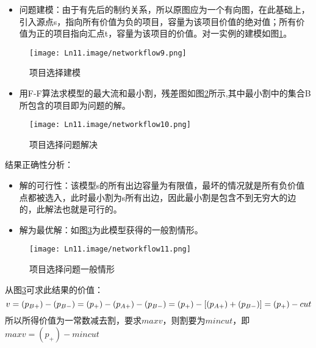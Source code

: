 \begin{itemize}
  \item 问题建模：由于有先后的制约关系，所以原图应为一个有向图，在此基础上，引入源点s，指向所有价值为负的项目，容量为该项目价值的绝对值；所有价值为正的项目指向汇点t，容量为该项目的价值。对一实例的建模如图\ref{fig9}。
\end{itemize}

\begin{figure}[htb]
  \centering
  \texttt{[image: Ln11.image/networkflow9.png]}
  \caption{项目选择建模}\label{fig9}
\end{figure}

\begin{itemize}
  \item 用F-F算法求模型的最大流和最小割，残差图如图\ref{fig10}所示,其中最小割中的集合B所包含的项目即为问题的解。
\end{itemize}

\begin{figure}[htb]
  \centering
  \texttt{[image: Ln11.image/networkflow10.png]}
  \caption{项目选择问题解决}\label{fig10}
\end{figure}

结果正确性分析：
\begin{itemize}
\item 解的可行性：该模型s的所有出边容量为有限值，最坏的情况就是所有负价值点都被选入，此时最小割为s所有出边，因此最小割是包含不到无穷大的边的，此解法也就是可行的。
\item 解为最优解：如图\ref{fig11}为此模型获得的一般割情形。
\end{itemize}
\begin{figure}[htb]
  \centering
  \texttt{[image: Ln11.image/networkflow11.png]}
  \caption{项目选择问题一般情形}\label{fig11}
\end{figure}

从图\ref{fig11}可求此结果的价值：
\begin{equation}
v = (p_{B+}) - (p_{B-}) = (p_+) - (p_{A+}) - (p_{B-}) = (p_+) - [(p_{A+}) + (p_{B-})] = (p_+) - cut\\
\end{equation}
所以所得价值为一常数减去割，要求\(maxv\)，则割要为\(mincut\)，即\(maxv = (p_+) -mincut\)

